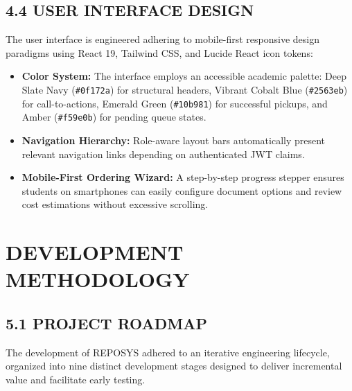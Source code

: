 \documentclass[12pt,a4paper,oneside]{report}
\begin{document}
\section{4.4 USER INTERFACE DESIGN}
The user interface is engineered adhering to mobile-first responsive design paradigms using React 19, Tailwind CSS, and Lucide React icon tokens:
\begin{itemize}[leftmargin=0.35in, itemsep=2pt]
  \item \textbf{Color System:} The interface employs an accessible academic palette: Deep Slate Navy (\texttt{\#0f172a}) for structural headers, Vibrant Cobalt Blue (\texttt{\#2563eb}) for call-to-actions, Emerald Green (\texttt{\#10b981}) for successful pickups, and Amber (\texttt{\#f59e0b}) for pending queue states.
  \item \textbf{Navigation Hierarchy:} Role-aware layout bars automatically present relevant navigation links depending on authenticated JWT claims.
  \item \textbf{Mobile-First Ordering Wizard:} A step-by-step progress stepper ensures students on smartphones can easily configure document options and review cost estimations without excessive scrolling.
\end{itemize}

\chapter{DEVELOPMENT METHODOLOGY}

\section{5.1 PROJECT ROADMAP}
The development of REPOSYS adhered to an iterative engineering lifecycle, organized into nine distinct development stages designed to deliver incremental value and facilitate early testing.
\end{document}
